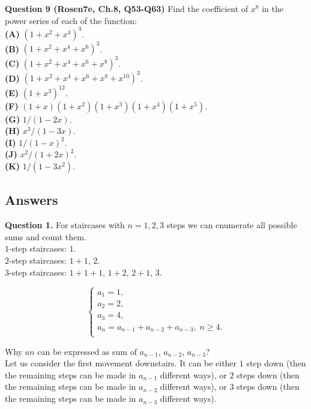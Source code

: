 \documentclass[jou]{apa6}
\begin{document}
\vspace{10pt}
{\bf Question 9  (Rosen7e, Ch.8, Q53-Q63)} 
Find the coefficient of $x^8$ in the power series of each of the function:\\
{\bf (A)} $(1 + x^2 + x^4)^3$.\\
{\bf (B)} $(1 + x^2 + x^4 + x^6)^3$.\\
{\bf (C)} $(1 + x^2 + x^4 + x^6 + x^8)^3$.\\
{\bf (D)} $(1 + x^2 + x^4 + x^6 + x^8 + x^{10})^3$.\\
{\bf (E)} $(1 + x^3)^{12}$.\\
{\bf (F)} $(1 + x)(1 + x^2)(1 + x^3)(1 + x^4)(1 + x^5)$.\\
{\bf (G)} $1/(1 - 2x)$.\\
{\bf (H)} $x^3/(1 - 3x)$.\\
{\bf (I)} $1/(1 - x)^2$.\\
{\bf (J)} $x^2/(1 + 2x)^{2}$.\\
{\bf (K)} $1/(1 - 3x^2)$.





\newpage

\subsection{Answers}

\vspace{10pt} 
{\bf Question 1.} For staircases with $n = 1,2,3$ steps we 
can enumerate all possible sums and count them.\\
$1$-step staircases: $1$.\\
$2$-step staircases: $1+1$, $2$.\\
$3$-step staircases: $1+1+1$, $1+2$, $2+1$, $3$.

$$\left\{ \begin{array}{l}
a_1 = 1, \\
a_2 = 2, \\
a_3 = 4, \\
a_{n} = a_{n-1} + a_{n-2} + a_{n-3},\;n \geq 4.\\
\end{array} \right.$$

Why $a{n}$ can be expressed as sum of $a_{n-1}$, $a_{n-2}$, $a_{n-3}$?\\
Let us consider the first movement downstairs. It can be either $1$ step down (then the 
remaining steps can be made in $a_{n-1}$ different ways), or $2$ steps down 
(then the remaining steps can be made in $a_{n-2}$ different ways),
or $3$ steps down (then the remaining steps can be made in $a_{n-3}$ different ways). 
\end{document}
